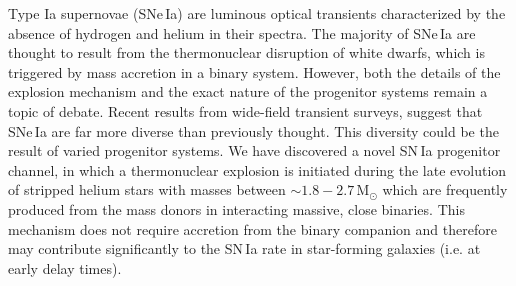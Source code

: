 \documentclass[../../main/thesis_msc.tex]{subfiles}
\begin{document}
Type Ia supernovae (SNe\,Ia) are luminous optical transients characterized by the absence of hydrogen and helium in their spectra. 
The majority of SNe\,Ia are thought to result from the thermonuclear disruption of white dwarfs, which is triggered by mass accretion in a binary system. 
However, both the details of the explosion mechanism and the exact nature of the progenitor systems remain a topic of debate. 
Recent results from wide-field transient surveys, suggest that SNe\,Ia are far more diverse than previously thought.
This diversity could be the result of varied progenitor systems.
We have discovered a novel SN\,Ia progenitor channel, in which a thermonuclear explosion is initiated during the late evolution of stripped helium stars with masses between $\sim 1.8-2.7$\,M$_{\odot}$ which are frequently produced from the mass donors in interacting massive, close binaries. This mechanism does not require accretion from the binary companion and therefore may contribute significantly to the SN\,Ia rate in star-forming galaxies (i.e. at early delay times).

\newpage

     
     
	

	
\end{document}
